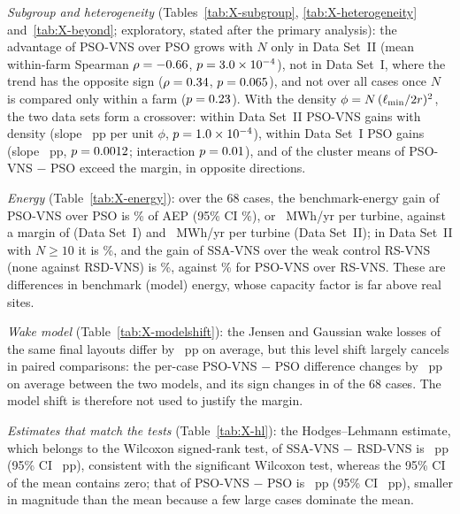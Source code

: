 \documentclass[10pt]{article}
\begin{document}
\emph{Subgroup and heterogeneity} (Tables~\ref{tab:X-subgroup}, \ref{tab:X-heterogeneity} and~\ref{tab:X-beyond}; exploratory, stated after the primary analysis): the advantage of PSO-VNS over PSO grows with $N$ only in Data Set~II (mean within-farm Spearman $\rho=-0.66$, $p=3.0\times10^{-4}$), not in Data Set~I, where the trend has the opposite sign ($\rho=0.34$, $p=0.065$), and not over all cases once $N$ is compared only within a farm ($p=0.23$). %
 With the density $\phi=N\,(\ell_{\min}/2r)^2$, the two data sets form a crossover: within Data Set~II PSO-VNS gains with density (slope \NXDensSlopeDsII~pp per unit $\phi$, $p=1.0\times10^{-4}$), within Data Set~I PSO gains (slope \NXDensSlopeDsI~pp, $p=0.0012$; interaction $p=0.01$), and \NXHetClBeyond{} of the \NXClustersNum{} cluster means of PSO-VNS $-$ PSO exceed the margin, in opposite directions. %

\emph{Energy} (Table~\ref{tab:X-energy}): over the 68 cases, the benchmark-energy gain of PSO-VNS over PSO is \NXEnPSOVNSvsPSOPct\% of AEP (95\% CI \NXEnPSOVNSvsPSOPctCI\%), or \NXEnPSOVNSvsPSOMWhTurb~MWh/yr per turbine, against a margin of \NXMarginMWhTurbDsI{} (Data Set~I) and \NXMarginMWhTurbDsII~MWh/yr per turbine (Data Set~II); in Data Set~II with $N\ge10$ it is \NXEnPSOVNSvsPSOdsIILargePct\%, and the gain of SSA-VNS over the weak control RS-VNS (none against RSD-VNS) is \NXEnSSAVNSvsRSVNSPct\%, against \NXEnPSOVNSvsRSVNSPct\% for PSO-VNS over RS-VNS. These are differences in benchmark (model) energy, whose capacity factor is far above real sites. %

\emph{Wake model} (Table~\ref{tab:X-modelshift}): the Jensen and Gaussian wake losses of the same final layouts differ by \NXModelShiftMean~pp on average, but this level shift largely cancels in paired comparisons: the per-case PSO-VNS $-$ PSO difference changes by \NXModelShiftPairMean~pp on average between the two models, and its sign changes in \NXModelShiftPairSignChanges{} of the 68 cases. The model shift is therefore not used to justify the margin. %

\emph{Estimates that match the tests} (Table~\ref{tab:X-hl}): the Hodges--Lehmann estimate, which belongs to the Wilcoxon signed-rank test, of SSA-VNS $-$ RSD-VNS is \NXHLSSAVNSvsRSDVNS~pp (95\% CI \NXHLSSAVNSvsRSDVNSCI~pp), consistent with the significant Wilcoxon test, whereas the 95\% CI of the mean contains zero; that of PSO-VNS $-$ PSO is \NXHLPSOVNSvsPSO~pp (95\% CI \NXHLPSOVNSvsPSOCI~pp), smaller in magnitude than the mean because a few large cases dominate the mean. %
\makeatletter
\begingroup
\def\supp@wraplabel{tab:X-heterogeneity}%
\let\supp@origlabel\label \let\supp@origmc\multicolumn
\def\label#1{\supp@origlabel{#1}\def\supp@tmp{#1}\ifx\supp@tmp\supp@wraplabel
  \def\multicolumn##1##2##3{\supp@origmc{##1}{p{0.9\textwidth}}{##3}}\fi}%

\endgroup
\makeatother
\end{document}
